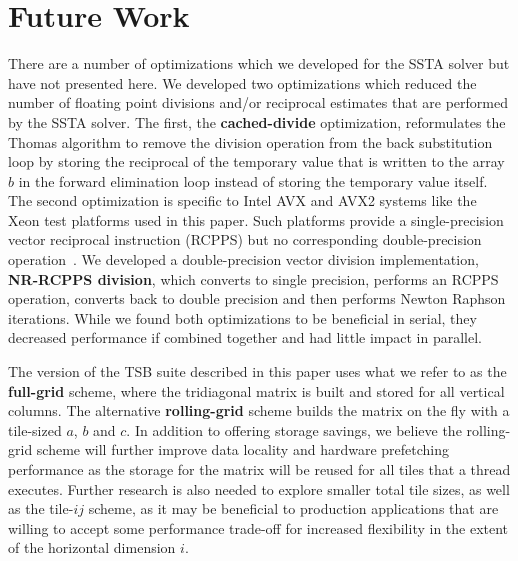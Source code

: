 \documentclass[10pt, conference, compsocconf]{IEEEtran}
\begin{document}
\section{Future Work}
\label{sec:future}

There are a number of optimizations which we developed for the SSTA
  solver but have not presented here. 
We developed two optimizations which reduced the number of floating point
  divisions and/or reciprocal estimates that are performed by the SSTA solver. 
The first, the \textbf{cached-divide} optimization, reformulates the Thomas 
  algorithm to remove the division operation from the back substitution loop by
  storing the reciprocal of the temporary value that is written to the array
  \(b\) in the forward elimination loop instead of storing the temporary value
  itself.
The second optimization is specific to Intel AVX and AVX2 systems like the Xeon
  test platforms used in this paper.
Such platforms provide a single-precision vector reciprocal instruction
  (RCPPS) but no corresponding double-precision
  operation~\cite{intel_opt_manual}.
We developed a double-precision vector division implementation,
  \textbf{NR-RCPPS division}, which converts to single precision, performs an
  RCPPS operation, converts back to double precision and then performs Newton
  Raphson iterations.
While we found both optimizations to be beneficial in serial, they decreased
  performance if combined together and had little impact in parallel.

The version of the TSB suite described in this paper uses what we refer to as
  the \textbf{full-grid} scheme, where the tridiagonal matrix is built and stored
  for all vertical columns.
The alternative \textbf{rolling-grid} scheme builds the matrix on the fly with
  a tile-sized \(a\), \(b\) and \(c\).
In addition to offering storage savings, we believe the rolling-grid scheme
  will further improve data locality and hardware prefetching performance as the
  storage for the matrix will be reused for all tiles that a thread
  executes.
Further research is also needed to explore smaller total tile sizes, as well as
  the tile-\(ij\) scheme, as it may be beneficial to production applications that
  are willing to accept some performance trade-off for increased flexibility in
  the extent of the horizontal dimension \(i\).

\end{document}
